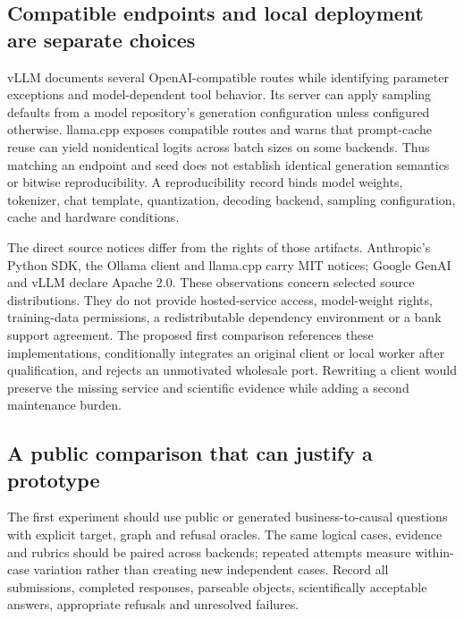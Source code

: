 \subsection{Compatible endpoints and local deployment are separate choices}

vLLM documents several OpenAI-compatible routes while identifying parameter
exceptions and model-dependent tool behavior. Its server can apply sampling
defaults from a model repository's generation configuration unless configured
otherwise. llama.cpp exposes compatible routes and warns that prompt-cache
reuse can yield nonidentical logits across batch sizes on some backends.
Thus matching an endpoint and seed does not establish identical generation
semantics or bitwise reproducibility. A reproducibility record binds model
weights, tokenizer, chat template, quantization, decoding backend, sampling
configuration, cache and hardware conditions.
\citep{exec24_backend_vllm,exec24_backend_llamacpp}

The direct source notices differ from the rights of those artifacts.
Anthropic's Python SDK, the Ollama client and llama.cpp carry MIT notices;
Google GenAI and vLLM declare Apache 2.0. These observations concern selected
source distributions. They do not provide hosted-service access, model-weight
rights, training-data permissions, a redistributable dependency environment
or a bank support agreement. The proposed first comparison references these
implementations, conditionally integrates an original client or local worker
after qualification, and rejects an unmotivated wholesale port. Rewriting a
client would preserve the missing service and scientific evidence while adding
a second maintenance burden.
\citep{exec24_backend_anthropic,exec24_backend_google,exec24_backend_ollama,
exec24_backend_vllm,exec24_backend_llamacpp,exec24_backend_reference}

\subsection{A public comparison that can justify a prototype}

The first experiment should use public or generated business-to-causal
questions with explicit target, graph and refusal oracles. The same logical
cases, evidence and rubrics should be paired across backends; repeated attempts
measure within-case variation rather than creating new independent cases.
Record all submissions, completed responses, parseable objects, scientifically
acceptable answers, appropriate refusals and unresolved failures.
\citep{exec24_backend_reference}

